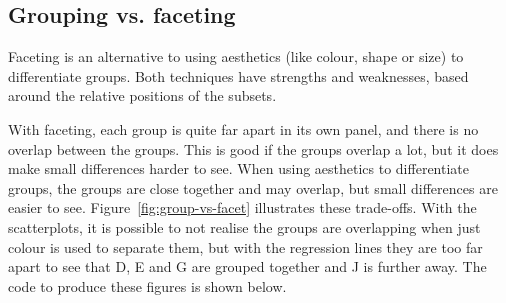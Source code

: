 % 

\subsection{Grouping vs. faceting}
\label{sub:group-vs-facet}

Faceting is an alternative to using aesthetics (like colour, shape or size) to differentiate groups. Both techniques have strengths and weaknesses, based around the relative positions of the subsets. 

With faceting, each group is quite far apart in its own panel, and there is no overlap between the groups.  This is good if the groups overlap a lot, but it does make small differences harder to see.  When using aesthetics to differentiate groups, the groups are close together and may overlap, but small differences are easier to see.  Figure~\ref{fig:group-vs-facet} illustrates these trade-offs.  With the scatterplots, it is possible to not realise the groups are overlapping when just colour is used to separate them, but with the regression lines they are too far apart to see that D, E and G are grouped together and J is further away.  The code to produce these figures is shown below.

% 
%
% 


